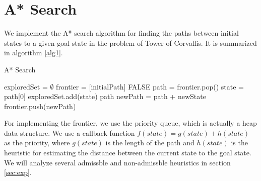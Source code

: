 \section{A* Search}\label{sec:astar}

We implement the A* search algorithm for finding the paths between initial states to a given goal state in the problem of Tower of Corvallis. It is summarized in algorithm \ref{alg1}.

\begin{algorithm}[H]
\caption{A* Search}
\label{alg1}
\begin{algorithmic}
\STATE exploredSet = $\emptyset$ 
\STATE frontier = [initialPath]
    \RETURN FALSE
\ENDIF
\STATE path = frontier.pop()
\STATE state = path[0]
\STATE exploredSet.add(state)
    \RETURN path
\ENDIF
{}
        \STATE newPath = path + newState
            \STATE frontier.push(newPath)
        \ENDIF
    \ENDFOR
\ENDFOR
\ENDWHILE
\end{algorithmic}
\end{algorithm}

For implementing the frontier, we use the priority queue, which is actually a heap data structure. We use a callback function $f(state) = g(state) + h(state)$ as the priority, where $g(state)$ is the length of the path and $h(state)$ is the heuristic for estimating the distance between the current state to the goal state. We will analyze several admissble and non-admissble heuristics in section \ref{sec:exp}.


